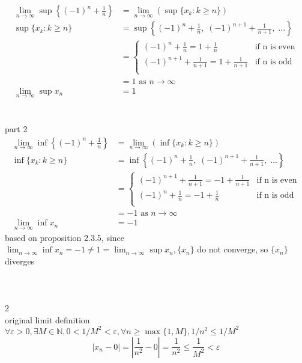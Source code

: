 \documentclass[12pt, border = 4pt, multi]{article} %
\begin{document}
\begin{align*}
\lim_{n \rightarrow \infty} \sup\left\{(-1) ^ n + \frac{1}{n}\right\} &= \lim_{n \rightarrow \infty}(\sup\{x_k: k \geq n\})\\
\sup\{x_k: k \geq n\} &= \sup\left\{(-1) ^ n + \frac{1}{n},\;(-1) ^ {n + 1} + \frac{1}{n + 1},\;...\right\}\\
&=
\begin{cases}
(-1) ^ n + \frac{1}{n} = 1 + \frac{1}{n} & \text{if n is even}\\
(-1) ^ {n + 1} + \frac{1}{n + 1} = 1 + \frac{1}{n + 1} & \text{if n is odd}\\
\end{cases}\\
&= 1 \text{ as } n \rightarrow \infty\\
\lim_{n \rightarrow \infty} \sup x_n &= 1
\end{align*}
\\
\\
part 2
\begin{align*}
\lim_{n \rightarrow \infty} \inf\left\{(-1) ^ n + \frac{1}{n}\right\} &= \lim_{n \rightarrow \infty}(\inf\{x_k: k \geq n\})\\
\inf\{x_k: k \geq n\} &= \inf\left\{(-1) ^ n + \frac{1}{n},\;(-1) ^ {n + 1} + \frac{1}{n + 1},\;...\right\}\\
&=
\begin{cases}
(-1) ^ {n + 1} + \frac{1}{n + 1} = -1 + \frac{1}{n + 1} & \text{if n is even}\\
(-1) ^ n + \frac{1}{n} = -1 + \frac{1}{n} & \text{if n is odd}\\
\end{cases}\\
&= -1 \text{ as } n \rightarrow \infty\\
\lim_{n \rightarrow \infty} \inf x_n &= -1
\end{align*}
based on proposition 2.3.5, since $\lim_{n \rightarrow \infty} \inf x_n = -1 \not= 1 = \lim_{n \rightarrow \infty} \sup x_n, \{x_n\}$ do not converge, so $\{x_n\}$ diverges\\
\\
\\
\\
2\\
original limit definition\\
$\forall \varepsilon > 0, \exists M \in \mathbb{N}, 0 < 1 / M ^ 2 < \varepsilon, \forall n \geq \max\{1, M\}, 1 / n ^ 2 \leq 1 / M ^ 2$
\[|x_n - 0| = \left|\frac{1}{n ^ 2}- 0\right| = \frac{1}{n ^ 2} \leq \frac{1}{M ^ 2} < \varepsilon\]
\end{document}
